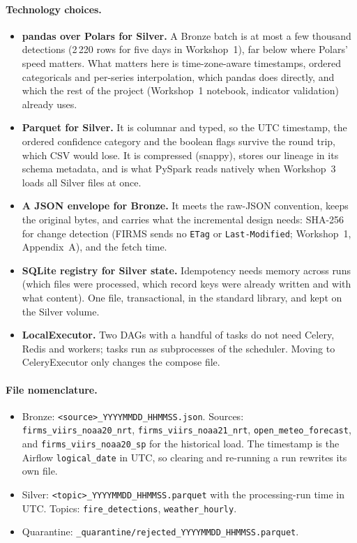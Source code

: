 \documentclass[11pt,a4paper]{article}
\newcommand{\code}[1]{\texttt{\small #1}}
\begin{document}
\paragraph{Technology choices.}
\begin{itemize}
  \item \textbf{pandas over Polars for Silver.} A Bronze batch is at most a few thousand
        detections (2\,220 rows for five days in Workshop~1), far below where Polars' speed matters.
        What matters here is time-zone-aware timestamps, ordered categoricals and per-series
        interpolation, which pandas does directly, and which the rest of the project (Workshop~1
        notebook, indicator validation) already uses.
  \item \textbf{Parquet for Silver.} It is columnar and typed, so the UTC timestamp, the ordered
        confidence category and the boolean flags survive the round trip, which CSV would lose. It is
        compressed (snappy), stores our lineage in its schema metadata, and is what PySpark reads
        natively when Workshop~3 loads all Silver files at once.
  \item \textbf{A JSON envelope for Bronze.} It meets the raw-JSON convention, keeps the original
        bytes, and carries what the incremental design needs: SHA-256 for change detection (FIRMS
        sends no \code{ETag} or \code{Last-Modified}; Workshop~1, Appendix~A), and the fetch time.
  \item \textbf{SQLite registry for Silver state.} Idempotency needs memory across runs (which
        files were processed, which record keys were already written and with what content). One
        file, transactional, in the standard library, and kept on the Silver volume.
  \item \textbf{LocalExecutor.} Two DAGs with a handful of tasks do not need Celery, Redis and
        workers; tasks run as subprocesses of the scheduler. Moving to CeleryExecutor only changes
        the compose file.
\end{itemize}

\paragraph{File nomenclature.}
\begin{itemize}
  \item Bronze: \code{<source>\_YYYYMMDD\_HHMMSS.json}. Sources: \code{firms\_viirs\_noaa20\_nrt},
        \code{firms\_viirs\_noaa21\_nrt}, \code{open\_meteo\_forecast}, and
        \code{firms\_viirs\_noaa20\_sp} for the historical load. The timestamp is the Airflow
        \code{logical\_date} in UTC, so clearing and re-running a run rewrites its own file.
  \item Silver: \code{<topic>\_YYYYMMDD\_HHMMSS.parquet} with the processing-run time in UTC. Topics:
        \code{fire\_detections}, \code{weather\_hourly}.
  \item Quarantine: \code{\_quarantine/rejected\_YYYYMMDD\_HHMMSS.parquet}.
\end{itemize}
\end{document}
